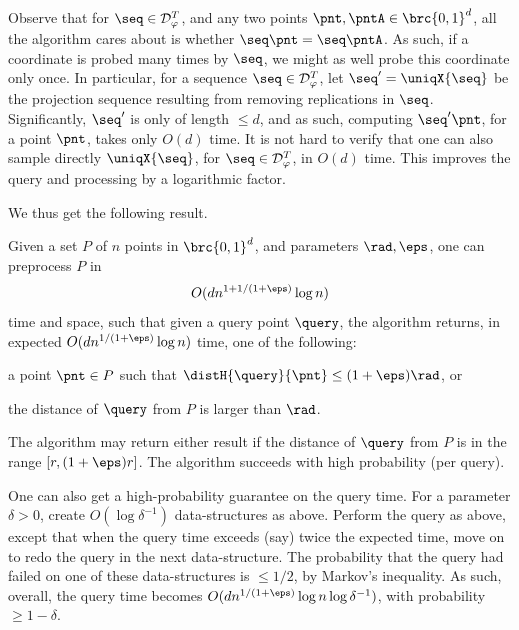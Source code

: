 Observe that for $\seq \in \DistD{\pr}^\tTimes$, and any two points
$\pnt, \pntA \in \brc{0,1}^d$, all the algorithm cares about is
whether $\seq \pnt = \seq \pntA$. As such, if a coordinate is probed
many times by $\seq$, we might as well probe this coordinate only
once. In particular, for a sequence $\seq \in \DistD{\pr}^\tTimes$,
let $\seq' = \uniqX{\seq}$ be the projection sequence resulting from
removing replications in $\seq$. Significantly, $\seq'$ is only of
length $\leq d$, and as such, computing $\seq' \pnt$, for a point
$\pnt$, takes only $O(d)$ time. It is not hard to verify that one can
also sample directly $\uniqX{\seq}$, for
$\seq \in \DistD{\pr}^\tTimes$, in $O(d)$ time. This improves the
query and processing by a logarithmic factor.




\bigskip

We thus get the following result.

\begin{theorem}
    Given a set $P$ of $n$ points in $\brc{0,1}^d$, and parameters
    $\rad, \eps$, one can preprocess $P$ in
    \begin{equation*}
        O( d n^{1+1/(1+\eps)} \log n)
    \end{equation*}
    time and space, such that given a query point $\query$, the
    algorithm returns, in expected $O( d n^{1/(1+\eps)} \log n)$ time,
    one of the following: \smallskip%
    \begin{compactenumA}
        \item a point $\pnt \in P$ such that
        $\distH{\query}{\pnt} \leq (1+\eps)\rad$, or

        \smallskip%
        \item the distance of $\query$ from $P$ is larger than $\rad$.
    \end{compactenumA}
    \smallskip%
    The algorithm may return either result if the distance of $\query$
    from $P$ is in the range $[r,(1+\eps)r]$. The algorithm succeeds
    with high probability (per query).
\end{theorem}

One can also get a high-probability guarantee on the query time. For a
parameter $\delta > 0$, create $O( \log \delta^{-1})$ \LSH
data-structures as above. Perform the query as above, except that when
the query time exceeds (say) twice the expected time, move on to redo
the query in the next \LSH data-structure. The probability that the
query had failed on one of these \LSH data-structures is
$\leq 1/2$, by Markov's inequality. As such, overall, the query time
becomes $O( d n^{1/(1+\eps)} \log n \log \delta^{-1})$, with
probability $\geq 1-\delta$.






